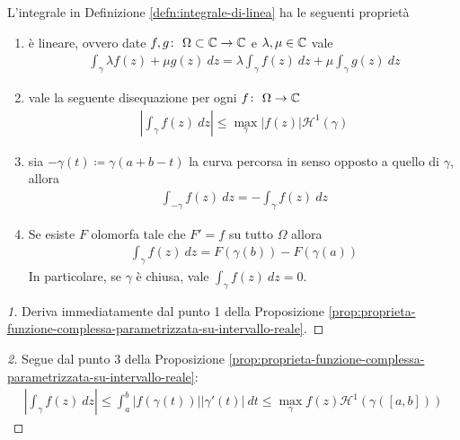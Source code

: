 \begin{proposition}
	\label{prop:proprieta-integrale-di-linea}
	L'integrale in Definizione \ref{defn:integrale-di-linea} ha le seguenti proprietà
	\begin{enumerate}
		\item è lineare, ovvero date $f,g \colon\ \Omega \subset \mathbb{C} \rightarrow \mathbb{C}$ e $\lambda, \mu \in \mathbb{C}$ vale
		\begin{equation*}
		\begin{aligned}
		\int_{\gamma} \lambda f(z) + \mu g(z) \ dz =  \lambda \int_{\gamma} f(z) \ dz + \mu \int_{\gamma} g(z) \ dz 
		\end{aligned}
		\end{equation*}
		\item vale la seguente disequazione per ogni $f \colon\ \Omega \rightarrow \mathbb{C}$
		\begin{equation*}
		\begin{aligned}
		\left|\int_{\gamma} f(z) \ dz\right| \le \max_{\gamma} |f(z)| \mathcal{H}^1(\gamma)	
		\end{aligned}
		\end{equation*}
		\item sia $-\gamma(t) \coloneqq \gamma(a+b-t)$ la curva percorsa in senso opposto a quello di $\gamma$, allora
		\begin{equation*}
		\begin{aligned}
		\int_{-\gamma} f(z) \ dz = - \int_{\gamma} f(z) \ dz
		\end{aligned}
		\end{equation*}
		\item Se esiste $F$ olomorfa tale che $F' = f$ su tutto $\Omega$ allora
		\begin{equation*}
		\begin{aligned}
		\int_\gamma f(z) \ dz = F(\gamma(b)) - F(\gamma(a))
		\end{aligned}
		\end{equation*}
		In particolare, se $\gamma$ è chiusa, vale $\int_\gamma f(z)\ dz = 0$.
	\end{enumerate}
\end{proposition}
\begin{proof}[1]
	Deriva immediatamente dal punto 1 della Proposizione \ref{prop:proprieta-funzione-complessa-parametrizzata-su-intervallo-reale}.
\end{proof}
\begin{proof}[2]	
	Segue dal punto $3$ della Proposizione \ref{prop:proprieta-funzione-complessa-parametrizzata-su-intervallo-reale}:
	\begin{equation*}
	\begin{aligned}
	\left|\int_\gamma f(z)\ dz\right| \le \int^b_a |f(\gamma(t))||\gamma'(t)| \ dt \le \max_{\gamma} f(z) \mathcal{H}^1(\gamma(\left[a,b\right])) 
	\end{aligned}
	\end{equation*}
\end{proof}
